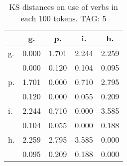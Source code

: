 \begin{table}[h!]
\begin{center}
\begin{tabular}{| l | c | c | c | c |}\hline
 & g. & p. & i. & h. \\\hline
g. & 0.000  & 1.701  & 2.244  & 2.259 \\\hline
 & 0.000  & 0.120  & 0.104  & 0.095 \\\hline
p. & 1.701  & 0.000  & 0.710  & 2.795 \\\hline
 & 0.120  & 0.000  & 0.055  & 0.209 \\\hline
i. & 2.244  & 0.710  & 0.000  & 3.585 \\\hline
 & 0.104  & 0.055  & 0.000  & 0.188 \\\hline
h. & 2.259  & 2.795  & 3.585  & 0.000 \\\hline
 & 0.095  & 0.209  & 0.188  & 0.000 \\\hline
\end{tabular}
\caption{KS distances on use of verbs in each 100 tokens. TAG: 5}
\end{center}
\end{table}